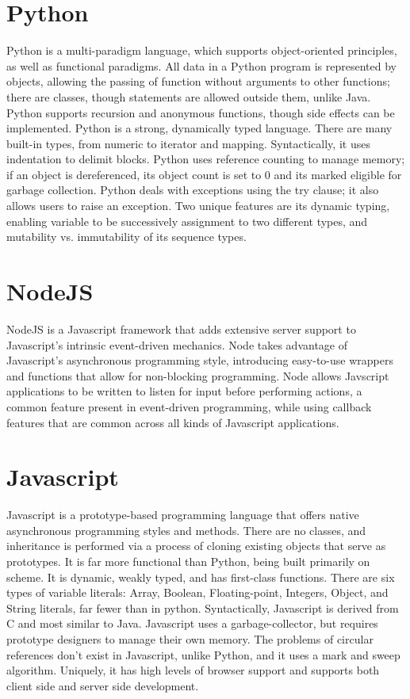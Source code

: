 \documentclass[letterpaper,twocolumn,10pt]{article}
\begin{document}
\section{Python}
Python is a multi-paradigm language, which supports object-oriented principles, as well as functional paradigms. All data in a Python program is represented by objects, allowing the passing of function without arguments to other functions; there are classes, though statements are allowed outside them, unlike Java. Python supports recursion and anonymous functions, though side effects can be implemented. Python is a strong, dynamically typed language. There are many built-in types, from numeric to iterator and mapping. Syntactically, it uses indentation to delimit blocks. Python uses reference counting to manage memory; if an object is dereferenced, its object count is set to 0 and its marked eligible for garbage collection. Python deals with exceptions using the try clause; it also allows users to raise an exception. Two unique features are its dynamic typing, enabling variable to be successively assignment to two different types, and mutability vs. immutability of its sequence types.

\section{NodeJS}
NodeJS is a Javascript framework that adds extensive server support to Javascript's intrinsic event-driven mechanics. Node takes advantage of Javascript's asynchronous programming style, introducing easy-to-use wrappers and functions that allow for non-blocking programming. Node allows Javscript applications to be written to listen for input before performing actions, a common feature present in event-driven programming, while using callback features that are common across all kinds of Javascript applications.

\section{Javascript}
Javascript is a prototype-based programming language that offers native asynchronous programming styles and methods. There are no classes, and inheritance is performed via a process of cloning existing objects that serve as prototypes. It is far more functional than Python, being built primarily on scheme. It is dynamic, weakly typed, and has first-class functions. There are six types of variable literals: Array, Boolean, Floating-point, Integers, Object, and String literals, far fewer than in python. Syntactically, Javascript is derived from C and most similar to Java. Javascript uses a garbage-collector, but requires prototype designers to manage their own memory. The problems of circular references don’t exist in Javascript, unlike Python, and it uses a mark and sweep algorithm. Uniquely, it has high levels of browser support and supports both client side and server side development.
\end{document}
